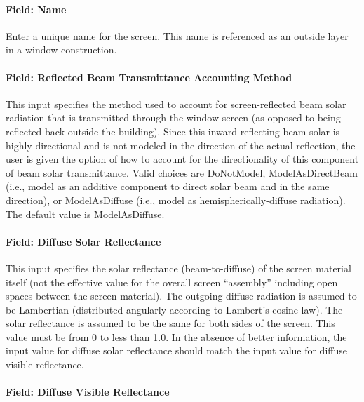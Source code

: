 \paragraph{Field: Name}\label{field-name-19-004}

Enter a unique name for the screen. This name is referenced as an outside layer in a window construction.

\paragraph{Field: Reflected Beam Transmittance Accounting Method}\label{field-reflected-beam-transmittance-accounting-method}

This input specifies the method used to account for screen-reflected beam solar radiation that is transmitted through the window screen (as opposed to being reflected back outside the building). Since this inward reflecting beam solar is highly directional and is not modeled in the direction of the actual reflection, the user is given the option of how to account for the directionality of this component of beam solar transmittance. Valid choices are DoNotModel, ModelAsDirectBeam (i.e., model as an additive component to direct solar beam and in the same direction), or ModelAsDiffuse (i.e., model as hemispherically-diffuse radiation). The default value is ModelAsDiffuse.

\paragraph{Field: Diffuse Solar Reflectance}\label{field-diffuse-solar-reflectance}

This input specifies the solar reflectance (beam-to-diffuse) of the screen material itself (not the effective value for the overall screen ``assembly'' including open spaces between the screen material). The outgoing diffuse radiation is assumed to be Lambertian (distributed angularly according to Lambert's cosine law). The solar reflectance is assumed to be the same for both sides of the screen. This value must be from 0 to less than 1.0. In the absence of better information, the input value for diffuse solar reflectance should match the input value for diffuse visible reflectance.

\paragraph{Field: Diffuse Visible Reflectance}\label{field-diffuse-visible-reflectance}

